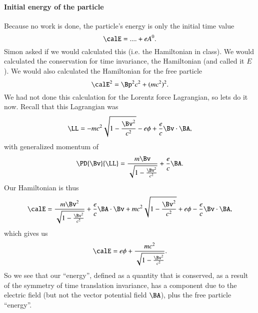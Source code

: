 {\paragraph{Initial energy of the particle}
%
Because no work is done, the particle's energy is only the initial time value
%
\begin{equation}\label{eqn:relativisticElectrodynamicsT3:520}
\calE = .... + e A^0.
\end{equation}
%
Simon asked if we would calculated this (i.e. the Hamiltonian in class).  We would calculated the conservation for time invariance, the Hamiltonian (and called it \(E\)).  We would also calculated the Hamiltonian for the free particle
%
\begin{equation}\label{eqn:relativisticElectrodynamicsT3:530}
\calE^2 = \Bp^2 c^2 + (m c^2)^2.
\end{equation}
%
We had not done this calculation for the Lorentz force Lagrangian, so lets do it now.  Recall that this Lagrangian was
%
\begin{equation}\label{eqn:relativisticElectrodynamicsT3:531}
\LL =
- m c^2 \sqrt{1 - \frac{\Bv^2}{c^2}} - e \phi + \frac{e}{c} \Bv \cdot \BA,
\end{equation}
with generalized momentum of
\begin{equation}\label{eqn:relativisticElectrodynamicsT3:532}
\PD{\Bv}{\LL} = \frac{m \Bv}{\sqrt{1 - \frac{\Bv^2}{c^2}}} + \frac{e}{c} \BA.
\end{equation}
%
Our Hamiltonian is thus
%
\begin{equation}\label{eqn:relativisticElectrodynamicsT3:1050}
\begin{aligned}
\calE
=
\frac{m \Bv^2}{\sqrt{1 - \frac{\Bv^2}{c^2}}} + \frac{e}{c} \BA \cdot \Bv
+ m c^2 \sqrt{1 - \frac{\Bv^2}{c^2}} + e \phi - \frac{e}{c} \Bv \cdot \BA,
\end{aligned}
\end{equation}
%
which gives us
%
\begin{equation}\label{eqn:relativisticElectrodynamicsT3:1070}
\begin{aligned}
\calE = e \phi + \frac{m c^2}{\sqrt{1 - \frac{\Bv^2}{c^2}}}.
\end{aligned}
\end{equation}
%
So we see that our ``energy'', defined as a quantity that is conserved, as a result of the symmetry of time translation invariance, has a component due to the electric field (but not the vector potential field \(\BA\)), plus the free particle ``energy''.

}

